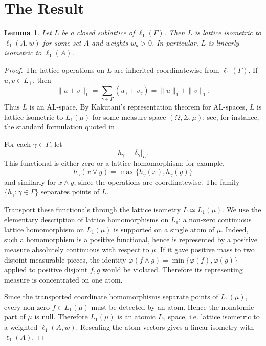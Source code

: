 \documentclass[11pt]{amsart}
\newtheorem{lemma}{Lemma}
\theoremstyle{definition}
\begin{document}
\section*{The Result}

\begin{lemma}\label{lem:sublattice-atomic}
Let \(L\) be a closed sublattice of \(\ell_1(\Gamma)\). Then \(L\) is
lattice isometric to \(\ell_1(A,w)\) for some set \(A\) and weights
\(w_a>0\). In particular, \(L\) is linearly isometric to \(\ell_1(A)\).
\end{lemma}

\begin{proof}
The lattice operations on \(L\) are inherited coordinatewise from
\(\ell_1(\Gamma)\). If \(u,v\in L_+\), then
\[
  \|u+v\|_1=\sum_{\gamma\in\Gamma}(u_\gamma+v_\gamma)
           =\|u\|_1+\|v\|_1.
\]
Thus \(L\) is an AL-space. By Kakutani's representation theorem for
AL-spaces, \(L\) is lattice isometric to \(L_1(\mu)\) for some measure
space \((\Omega,\Sigma,\mu)\); see, for instance, the standard formulation
quoted in \cite[Theorem 4.27]{AB}.

For each \(\gamma\in\Gamma\), let
\[
  h_\gamma=\delta_\gamma|_L .
\]
This functional is either zero or a lattice homomorphism: for example,
\[
  h_\gamma(x\vee y)=\max\{h_\gamma(x),h_\gamma(y)\}
\]
and similarly for \(x\wedge y\), since the operations are coordinatewise.
The family \(\{h_\gamma:\gamma\in\Gamma\}\) separates points of \(L\).

Transport these functionals through the lattice isometry
\(L\simeq L_1(\mu)\). We use the elementary description of lattice
homomorphisms on \(L_1\): a non-zero continuous lattice homomorphism on
\(L_1(\mu)\) is supported on a single atom of \(\mu\). Indeed, such a
homomorphism is a positive functional, hence is represented by a positive
measure absolutely continuous with respect to \(\mu\). If it gave positive
mass to two disjoint measurable pieces, the identity
\(\varphi(f\wedge g)=\min\{\varphi(f),\varphi(g)\}\) applied to positive
disjoint \(f,g\) would be violated. Therefore its representing measure is
concentrated on one atom.

Since the transported coordinate homomorphisms separate points of
\(L_1(\mu)\), every non-zero \(f\in L_1(\mu)\) must be detected by an atom.
Hence the nonatomic part of \(\mu\) is null. Therefore \(L_1(\mu)\) is an
atomic \(L_1\) space, i.e. lattice isometric to a weighted
\(\ell_1(A,w)\). Rescaling the atom vectors gives a linear isometry with
\(\ell_1(A)\).
\end{proof}
\end{document}
